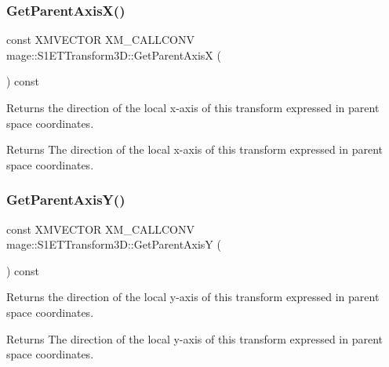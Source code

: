 \subsubsection{\texorpdfstring{Get\+Parent\+Axis\+X()}{GetParentAxisX()}}
{\footnotesize\ttfamily const X\+M\+V\+E\+C\+T\+OR X\+M\+\_\+\+C\+A\+L\+L\+C\+O\+NV mage\+::\+S1\+E\+T\+Transform3\+D\+::\+Get\+Parent\+AxisX (\begin{DoxyParamCaption}{ }\end{DoxyParamCaption}) const\hspace{0.3cm}{\ttfamily [noexcept]}}

Returns the direction of the local x-\/axis of this transform expressed in parent space coordinates.

\begin{DoxyReturn}{Returns}
The direction of the local x-\/axis of this transform expressed in parent space coordinates. 
\end{DoxyReturn}
\mbox{\label{classmage_1_1_s1_e_t_transform3_d_ac5e516aa2d019edd6594fa1c7f501f20}} 
\subsubsection{\texorpdfstring{Get\+Parent\+Axis\+Y()}{GetParentAxisY()}}
{\footnotesize\ttfamily const X\+M\+V\+E\+C\+T\+OR X\+M\+\_\+\+C\+A\+L\+L\+C\+O\+NV mage\+::\+S1\+E\+T\+Transform3\+D\+::\+Get\+Parent\+AxisY (\begin{DoxyParamCaption}{ }\end{DoxyParamCaption}) const\hspace{0.3cm}{\ttfamily [noexcept]}}

Returns the direction of the local y-\/axis of this transform expressed in parent space coordinates.

\begin{DoxyReturn}{Returns}
The direction of the local y-\/axis of this transform expressed in parent space coordinates. 
\end{DoxyReturn}
\mbox{\label{classmage_1_1_s1_e_t_transform3_d_a8d2b254951acef7b601d7aa848552b01}} 
